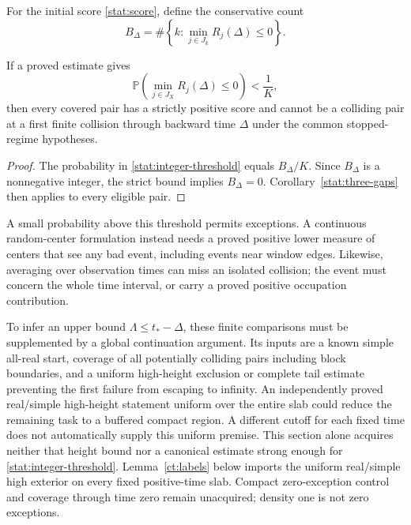For the initial score \eqref{stat:score}, define the conservative count
\begin{equation}
 B_\Delta=\#\left\{k:\min_{j\in J_k}R_j(\Delta)\le0\right\}.
 \label{stat:bad-count}
\end{equation}
\begin{proposition}
\label{stat:integer-exclusion}
If a proved estimate gives
\begin{equation}
 \mathbb P\!\left(\min_{j\in J_X}R_j(\Delta)\le0\right)<\frac1K,
 \label{stat:integer-threshold}
\end{equation}
then every covered pair has a strictly positive score and cannot be a
colliding pair at a first finite collision through backward time
$\Delta$ under the common stopped-regime hypotheses.
\end{proposition}

\begin{proof}
The probability in \eqref{stat:integer-threshold} equals $B_\Delta/K$.
Since $B_\Delta$ is a nonnegative integer, the strict bound implies
$B_\Delta=0$. Corollary~\ref{stat:three-gaps} then applies to every
eligible pair.
\end{proof}

A small probability above this threshold permits exceptions. A continuous
random-center formulation instead needs a proved positive lower measure
of centers that see any bad event, including events near window edges.
Likewise, averaging over observation times can miss an isolated collision;
the event must concern the whole time interval, or carry a proved positive
occupation contribution.

To infer an upper bound $\Lambda\le t_*-\Delta$, these finite comparisons
must be supplemented by a global continuation argument. Its inputs are
a known simple all-real start, coverage of all potentially colliding
pairs including block boundaries, and a uniform high-height exclusion or
complete tail estimate preventing the first failure from escaping to
infinity. An independently proved real/simple high-height statement
uniform over the entire slab could reduce the remaining task to a
buffered compact region. A different cutoff for each fixed time does
not automatically supply this uniform premise. This section alone acquires
neither that height bound nor a canonical estimate strong enough for
\eqref{stat:integer-threshold}. Lemma~\ref{ct:labels} below imports the
uniform real/simple high exterior on every fixed positive-time slab.
Compact zero-exception control and coverage through time zero remain
unacquired; density one is not zero exceptions.

